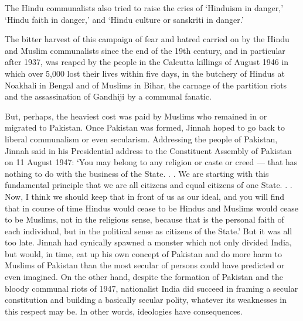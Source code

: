 The Hindu communalists also tried to raise the cries of ‘Hinduism in danger,’ ‘Hindu faith in danger,’ and ‘Hindu culture or sanskriti in danger.’ 

The bitter harvest of this campaign of fear and hatred carried on by the Hindu and Muslim communalists since the end of the 19th century, and in particular after 1937, was reaped by the people in the Calcutta killings of August 1946 in which over 5,000 lost their lives within five days, in the butchery of Hindus at Noakhali in Bengal and of Muslims in Bihar, the carnage of the partition riots and the assassination of Gandhiji by a communal fanatic. 

But, perhaps, the heaviest cost was paid by Muslims who remained in or migrated to Pakistan. Once Pakistan was formed, Jinnah hoped to go back to liberal communalism or even secularism. Addressing the people of Pakistan, Jinnah said in his Presidential address to the Constituent Assembly of Pakistan on 11 August 1947: ‘You may belong to any religion or caste or creed — that has nothing to do with the business of the State. . . We are starting with this fundamental principle that we are all citizens and equal citizens of one State. . . Now, I think we should keep that in front of us as our ideal, and you will find that in course of time Hindus would cease to be Hindus and Muslims would cease to be Muslims, not in the religious sense, because that is the personal faith of each individual, but in the political sense as citizens of the State.’ But it was all too late. Jinnah had cynically spawned a monster which not only divided India, but would, in time, eat up his own concept of Pakistan and do more harm to Muslims of Pakistan than the most secular of persons could have predicted or even imagined. On the other hand, despite the formation of Pakistan and the bloody communal riots of 1947, nationalist India did succeed in framing a secular constitution and building a basically secular polity, whatever its weaknesses in this respect may be. In other words, ideologies have consequences. 

